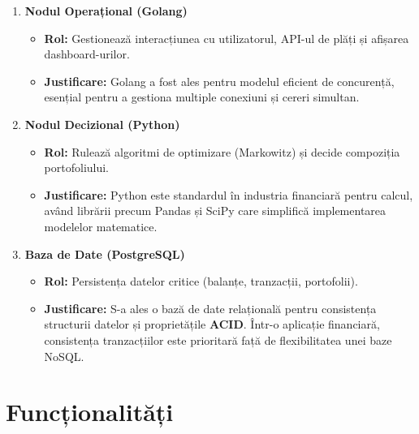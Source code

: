 \documentclass[12pt, a4paper]{article}
\begin{document}
\begin{enumerate}[label=\textbf{\arabic*.}]
    \item \textbf{Nodul Operațional (Golang)}
    \begin{itemize}
        \item \textbf{Rol:} Gestionează interacțiunea cu utilizatorul, API-ul de plăți și afișarea dashboard-urilor.
        \item \textbf{Justificare:} Golang a fost ales pentru modelul eficient de concurență, esențial pentru a gestiona multiple conexiuni și cereri simultan.
    \end{itemize}
    
    \item \textbf{Nodul Decizional (Python)}
    \begin{itemize}
        \item \textbf{Rol:} Rulează algoritmi de optimizare (Markowitz) și decide compoziția portofoliului.
        \item \textbf{Justificare:} Python este standardul în industria financiară pentru calcul, având librării precum Pandas și SciPy care simplifică implementarea modelelor matematice.
    \end{itemize}
    
    \item \textbf{Baza de Date (PostgreSQL)}
    \begin{itemize}
        \item \textbf{Rol:} Persistența datelor critice (balanțe, tranzacții, portofolii).
        \item \textbf{Justificare:} S-a ales o bază de date relațională pentru consistența structurii datelor și proprietățile \textbf{ACID}. Într-o aplicație financiară, consistența tranzacțiilor este prioritară față de flexibilitatea unei baze NoSQL.
    \end{itemize}
\end{enumerate}

\section{Funcționalități}
\end{document}
